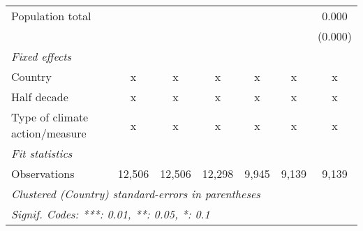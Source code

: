 \begin{tabular}{lcccccc}
   Population total                     &         &         &         &         &         & 0.000\\   
                                        &         &         &         &         &         & (0.000)\\   
   \emph{Fixed effects}\\
   Country                              & x       & x       & x       & x       & x       & x\\  
   Half decade                          & x       & x       & x       & x       & x       & x\\  
   Type of climate action/measure       & x       & x       & x       & x       & x       & x\\  
   \midrule \emph{Fit statistics}\\
   Observations                         & 12,506  & 12,506  & 12,298  & 9,945   & 9,139   & 9,139\\  
   \midrule
   \multicolumn{7}{l}{\emph{Clustered (Country) standard-errors in parentheses}}\\
   \multicolumn{7}{l}{\emph{Signif. Codes: ***: 0.01, **: 0.05, *: 0.1}}\\
\end{tabular}
\par\endgroup


